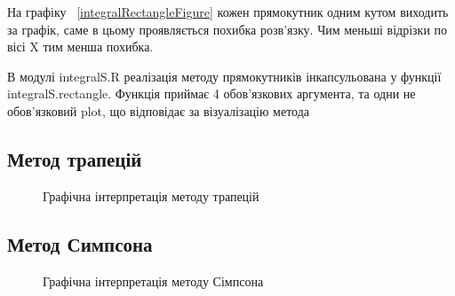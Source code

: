 \documentclass[12pt,a4paper]{article}
\begin{document}
На графіку ~\ref{integralRectangleFigure} кожен прямокутник одним кутом виходить за графік, саме в цьому проявляється похибка розв'язку. Чим меньші відрізки по вісі X тим менша похибка.


В модулі integralS.R реалізація методу прямокутників інкапсульована у функції integralS.rectangle. Функція приймає 4 обов'язкових аргумента, та одни не обов'язковий plot, що відповідає за візуалізацію метода

\clearpage
\subsection{Метод трапецій}

\begin{figure}[ht]
    \centering
    \def\svgwidth{\columnwidth}
    \caption{Графічна інтерпретація методу трапецій}\label{integralTrapezeFigure}
    
\end{figure}


\clearpage
\subsection{Метод Симпсона} \label{subsection}

\begin{figure}[ht]
    \centering
    \def\svgwidth{\columnwidth}
    \caption{Графічна інтерпретація методу Сімпсона}\label{integralSimpsonFigure}
    
\end{figure}

\end{document}
